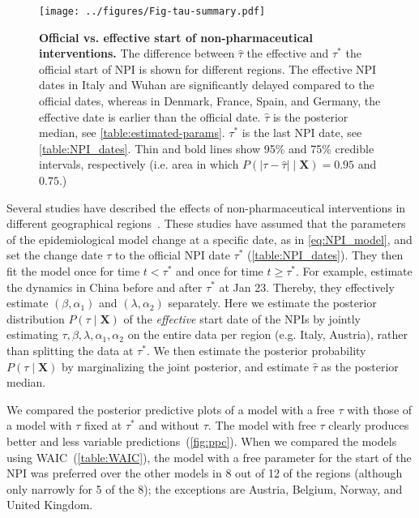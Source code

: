 \documentclass[12pt]{extarticle}
\let\vec\mathbf
\begin{document}
\begin{figure}[b!]
    \centering
	\texttt{[image: ../figures/Fig-tau-summary.pdf]}
    \caption{
    \textbf{Official vs. effective start of non-pharmaceutical interventions.}
    	The difference between $\hat{\tau}$ the effective and $\tau^*$ the official start of NPI is shown for different regions. The effective NPI dates in Italy and Wuhan are significantly delayed compared to the official dates, whereas in Denmark, France, Spain, and Germany, the effective date is earlier than the official date.
	$\hat{\tau}$ is the posterior median, see \autoref{table:estimated-params}. $\tau^*$ is the last NPI date, see \autoref{table:NPI_dates}. Thin and bold lines show 95\% and 75\% credible intervals, respectively (i.e. area in which $P(|\tau - \hat{\tau}| \mid \vec{X}) = 0.95$ and $0.75$.)
    }
    \label{fig:tau-summary}
\end{figure}



Several studies have described the effects of non-pharmaceutical interventions in different geographical regions~\citep{Flaxman2020,Gatto2020,Li2020}. 
These studies have assumed that the parameters of the epidemiological model change at a specific date, as in \autoref{eq:NPI_model}, and set the change date $\tau$ to the official NPI date $\tau^*$ (\autoref{table:NPI_dates}).
They then fit the model once for time $t<\tau^*$ and once for time $t \ge \tau^*$.
For example, \citet{Li2020} estimate the dynamics in China before and after $\tau^*$ at Jan 23. Thereby, they effectively estimate $(\beta, \alpha_1)$ and $(\lambda, \alpha_2)$ separately.
Here we estimate the posterior distribution $P(\tau \mid \vec{X})$ of the \emph{effective} start date of the NPIs by jointly estimating $\tau, \beta, \lambda, \alpha_1, \alpha_2$ on the entire data per region (e.g. Italy, Austria), rather than splitting the data at $\tau^*$.
We then estimate the posterior probability $P(\tau \mid \vec{X})$ by marginalizing the joint posterior, and estimate $\hat{\tau}$ as the posterior median.

We compared the posterior predictive plots of a model with a free $\tau$ with those of a model with $\tau$ fixed at $\tau^*$ and without $\tau$. The model with free $\tau$ clearly produces better and less variable predictions~(\autoref{fig:ppc}). 
When we compared the models using WAIC~(\autoref{table:WAIC}), the model with a free parameter for the start of the NPI was preferred over the other models in 8 out of 12 of the regions (although only narrowly for 5 of the 8); the exceptions are Austria, Belgium, Norway, and United Kingdom.
\end{document}
